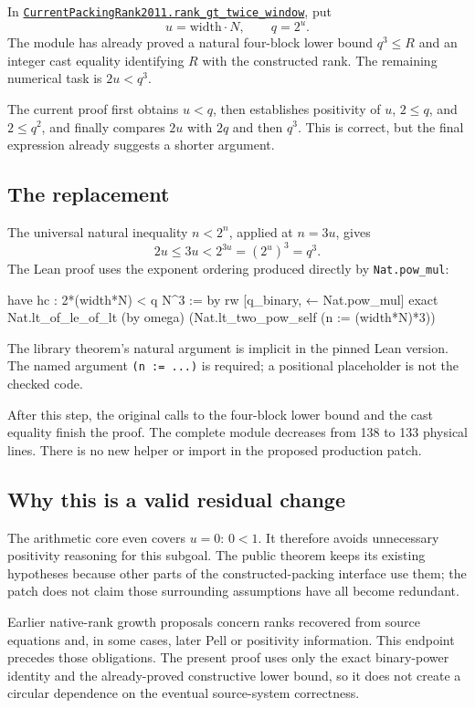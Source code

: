 \documentclass[11pt,letterpaper]{article}
\newcommand{\code}[1]{\texttt{\small #1}}
\newcommand{\source}[2]{\href{https://github.com/VladimirReshetnikov/ProveIt/blob/9d9d1123b39927d30363f1dcd53c23f0575c30ee/Computability/DiophantineConsistency/Lean/DiophantineConsistency/#1.lean}{\code{#1.#2}}}
\begin{document}
In \source{CurrentPackingRank2011}{rank\_gt\_twice\_window}, put
\[
 u=\mathrm{width}\cdot N,\qquad q=2^u.
\]
The module has already proved a natural four-block lower bound $q^3\le R$ and an integer cast equality identifying $R$ with the constructed rank. The remaining numerical task is $2u<q^3$.

The current proof first obtains $u<q$, then establishes positivity of $u$, $2\le q$, and $2\le q^2$, and finally compares $2u$ with $2q$ and then $q^3$. This is correct, but the final expression already suggests a shorter argument.

\subsection{The replacement}

The universal natural inequality $n<2^n$, applied at $n=3u$, gives
\[
 2u\le 3u<2^{3u}=(2^u)^3=q^3.
\]
The Lean proof uses the exponent ordering produced directly by \code{Nat.pow\_mul}:
\begin{Lean}
have hc : 2*(width*N) < q N^3 := by
  rw [q_binary, ← Nat.pow_mul]
  exact Nat.lt_of_le_of_lt (by omega)
    (Nat.lt_two_pow_self (n := (width*N)*3))
\end{Lean}

The library theorem's natural argument is implicit in the pinned Lean version. The named argument \code{(n := ...)} is required; a positional placeholder is not the checked code.

After this step, the original calls to the four-block lower bound and the cast equality finish the proof. The complete module decreases from 138 to 133 physical lines. There is no new helper or import in the proposed production patch.

\subsection{Why this is a valid residual change}

The arithmetic core even covers $u=0$: $0<1$. It therefore avoids unnecessary positivity reasoning for this subgoal. The public theorem keeps its existing hypotheses because other parts of the constructed-packing interface use them; the patch does not claim those surrounding assumptions have all become redundant.

Earlier native-rank growth proposals concern ranks recovered from source equations and, in some cases, later Pell or positivity information. This endpoint precedes those obligations. The present proof uses only the exact binary-power identity and the already-proved constructive lower bound, so it does not create a circular dependence on the eventual source-system correctness.
\end{document}

